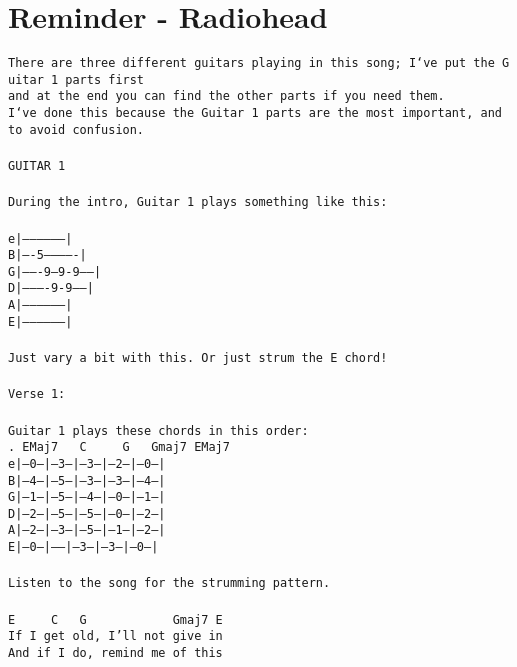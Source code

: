 \newpage
\section{Reminder - Radiohead}
\label{Reminder - Radiohead}
\texttt{There\ are\ three\ different\ guitars\ playing\ in\ this\ song;\ I`ve\ put\ the\ Guitar\ 1\ parts\ first\\
and\ at\ the\ end\ you\ can\ find\ the\ other\ parts\ if\ you\ need\ them.\\
I`ve\ done\ this\ because\ the\ Guitar\ 1\ parts\ are\ the\ most\ important,\ and\ to\ avoid\ confusion.\\
\\
GUITAR\ 1\\
\\
During\ the\ intro,\ Guitar\ 1\ plays\ something\ like\ this:\\
\\
e|------------------|\\
B|----5-------------|\\
G|-------9--9-9-----|\\
D|----------9-9-----|\\
A|------------------|\\
E|------------------|\\
\\
Just\ vary\ a\ bit\ with\ this.\ Or\ just\ strum\ the\ E\ chord!\\
\\
Verse\ 1:\\
\\
Guitar\ 1\ plays\ these\ chords\ in\ this\ order:\\
.\ EMaj7\ \ \ C\ \ \ \ \ G\ \ \ Gmaj7\ EMaj7\\
e|--0--|--3--|--3--|--2--|--0--|\\
B|--4--|--5--|--3--|--3--|--4--|\\
G|--1--|--5--|--4--|--0--|--1--|\\
D|--2--|--5--|--5--|--0--|--2--|\\
A|--2--|--3--|--5--|--1--|--2--|\\
E|--0--|-----|--3--|--3--|--0--|\\
\\
Listen\ to\ the\ song\ for\ the\ strumming\ pattern.\\
\\
E\ \ \ \ \ C\ \ \ G\ \ \ \ \ \ \ \ \ \ \ \ Gmaj7\ E\\
If\ I\ get\ old,\ I'll\ not\ give\ in\\
And\ if\ I\ do,\ remind\ me\ of\ this\\
}
